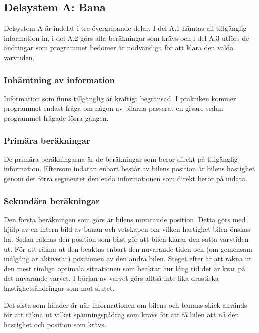   \subsection{Delsystem A: Bana}
  
  Delsystem A är indelat i tre övergripande delar. I del A.1 hämtas all
  tillgänglig information in, i del A.2 görs alla beräkningar som krävs och i
  del A.3 utförs de ändringar som programmet bedömer är nödvändiga för att
  klara den valda varvtiden. 

    \subsubsection{Inhämtning av information}

    Information som finns tillgänglig är kraftigt begränsad. I praktiken kommer
    programmet endast fråga om någon av bilarna passerat en givare sedan
    programmet frågade förra gången.

    \subsubsection{Primära beräkningar}

    De primära beräkningarna är de beräkningar som beror direkt på tillgänglig
    information. Eftersom indatan enbart består av bilens position är bilens
    hastighet genom det förra segmentet den enda informationen som direkt beror
    på indata.

    \subsubsection{Sekundära beräkningar}
    
    Den första beräkningen som görs är bilens nuvarande position. Detta görs med
    hjälp av en intern bild av banan och vetskapen om vilken hastighet bilen
    önskas ha. Sedan räknas den position som bäst gör att bilen klarar den satta
    varvtiden ut. För att räkna ut den beaktas enbart den nuvarande tiden och
    (om gemensam målgång är aktiverat) positionen av den andra bilen. Steget
    efter är att räkna ut den mest rimliga optimala situationen som beaktar hur
    lång tid det är kvar på det nuvarande varvet. I början av varvet görs alltså
    inte lika drastiska hastighetsändringar som mot slutet.

    Det sista som händer är när informationen om bilens och banans skick används
    för att räkna ut vilket spänningspådrag som krävs för att få bilen att nå
    den hastighet och position som krävs.

